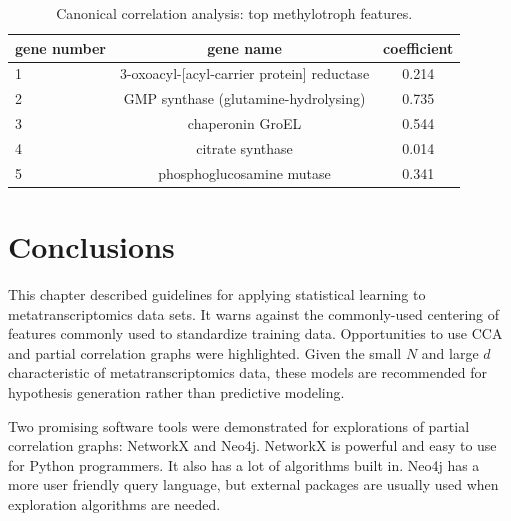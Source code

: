 \begin{table}[H]
\centering
\begin{singlespace}
\caption[Canonical correlation analysis: top features]{Canonical correlation analysis: top methylotroph features.}
\begin{tabular}{l | c | c}
          gene number & gene name & coefficient  \\
\midrule
	1 & 3-oxoacyl-[acyl-carrier protein] reductase & 0.214 \\ 
	2 & GMP synthase (glutamine-hydrolysing) & 0.735 \\
	3 & chaperonin GroEL & 0.544 \\
	4 & citrate synthase & 0.014 \\
	5 & phosphoglucosamine mutase & 0.341 \\
\end{tabular}
\label{table:CCA_methylotroph}
\end{singlespace}
\end{table}

\section{Conclusions}

This chapter described guidelines for applying statistical learning to metatranscriptomics data sets. 
It warns against the commonly-used centering of features commonly used to standardize training data.  
Opportunities to use CCA and partial correlation graphs were highlighted.
Given the small $N$ and large $d$ characteristic of metatranscriptomics data, these models are recommended for hypothesis generation rather than predictive modeling. 

Two promising software tools were demonstrated for explorations of partial correlation graphs: NetworkX and Neo4j.
NetworkX is powerful and easy to use for Python programmers.  It also has a lot of algorithms built in.
Neo4j has a more user friendly query language, but external packages are usually used when exploration algorithms are needed.

